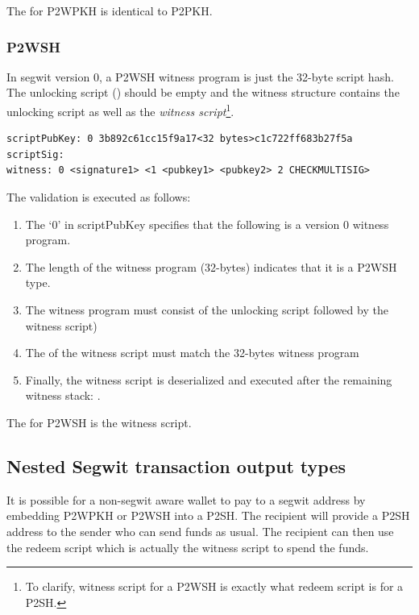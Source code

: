 The  for P2WPKH is identical to P2PKH.


\subsubsection*{P2WSH}
In segwit version 0, a P2WSH witness program is just the 32-byte script hash. The unlocking script () should be empty and the witness structure contains the unlocking script as well as the \emph{witness script}\footnote{To clarify, witness script for a P2WSH is exactly what redeem script is for a P2SH.}.

\begin{emphbox}
\begin{lstlisting}[style=Pseudomath]
scriptPubKey: 0 3b892c61cc15f9a17<32 bytes>c1c722ff683b27f5a
scriptSig:
witness: 0 <signature1> <1 <pubkey1> <pubkey2> 2 CHECKMULTISIG>
\end{lstlisting}
\end{emphbox}

The validation is executed as follows:
\begin{enumerate}
\item The `0' in scriptPubKey specifies that the following is a version 0 witness program.
\item The length of the witness program (32-bytes) indicates that it is a P2WSH type.
\item The witness program must consist of the unlocking script followed by the witness script) 
\item The  of the witness script must match the 32-bytes witness program
\item Finally, the witness script is deserialized and executed after the remaining witness stack: .
\end{enumerate}

The  for P2WSH is the witness script.


\subsection*{Nested Segwit transaction output types}
It is possible for a non-segwit aware wallet to pay to a segwit address by embedding P2WPKH or P2WSH into a P2SH. The recipient will provide a P2SH address to the sender who can send funds as usual. The recipient can then use the redeem script which is actually the witness script to spend the funds.

